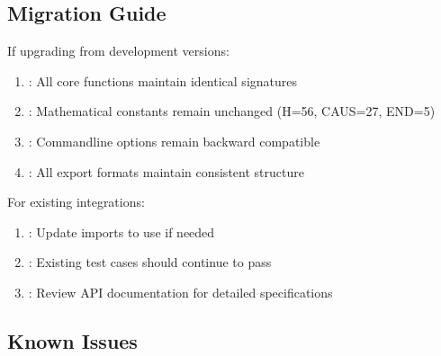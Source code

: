 \documentclass[letterpaper,10pt,english]{sphinxmanual}
\begin{document}
\subsection{Migration Guide}
\label{\detokenize{changelog:migration-guide}}
\sphinxAtStartPar
{}

\sphinxAtStartPar
If upgrading from development versions:
\begin{enumerate}
%
\item {} 
\sphinxAtStartPar
{}: All core functions maintain identical signatures

\item {} 
\sphinxAtStartPar
{}: Mathematical constants remain unchanged (H=56, CAUS=27, END=5)

\item {} 
\sphinxAtStartPar
{}: Command\sphinxhyphen{}line options remain backward compatible

\item {} 
\sphinxAtStartPar
{}: All export formats maintain consistent structure

\end{enumerate}

\sphinxAtStartPar
{}

\sphinxAtStartPar
For existing integrations:
\begin{enumerate}
%
\item {} 
\sphinxAtStartPar
{}: Update imports to use  if needed

\item {} 
\sphinxAtStartPar
{}: Existing test cases should continue to pass

\item {} 
\sphinxAtStartPar
{}: Review API documentation for detailed specifications

\end{enumerate}


\subsection{Known Issues}
\label{\detokenize{changelog:known-issues}}
\sphinxAtStartPar
{}
\end{document}
